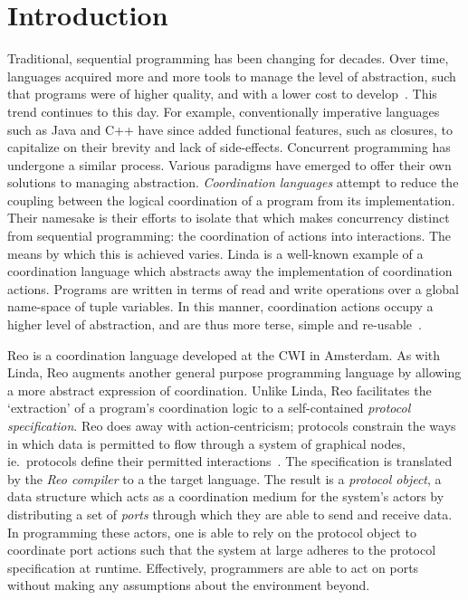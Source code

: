 \chapter{Introduction}	


Traditional, sequential programming has been changing for decades. Over time, languages acquired more and more tools to manage the level of abstraction, such that programs were of higher quality, and with a lower cost to develop~\cite{shaw1984abstraction}. This trend continues to this day. For example, conventionally imperative languages such as Java and C++ have since added functional features, such as closures, to capitalize on their brevity and lack of side-effects. Concurrent programming has undergone a similar process. Various paradigms have emerged to offer their own solutions to managing abstraction. \textit{Coordination languages} attempt to reduce the coupling between the logical coordination of a program from its implementation. Their namesake is their efforts to isolate that which makes concurrency distinct from sequential programming: the coordination of actions into interactions. The means by which this is achieved varies. Linda is a well-known example of a coordination language which abstracts away the implementation of coordination actions. Programs are written in terms of read and write operations over a global name-space of tuple variables. In this manner, coordination actions occupy a higher level of abstraction, and are thus more terse, simple and re-usable~\cite{gelernter1985generative}.


Reo is a coordination language developed at the CWI in Amsterdam. As with Linda, Reo augments another general purpose programming language by allowing a more abstract expression of coordination. Unlike Linda, Reo facilitates the `extraction' of a program's coordination logic to a self-contained \textit{protocol specification}. Reo does away with action-centricism; protocols constrain the ways in which data is permitted to flow through a system of graphical nodes, ie.\ protocols define their permitted interactions~\cite{arbab2005abstract}. The specification is translated by the \textit{Reo compiler} to a the target language. The result is a \textit{protocol object}, a data structure which acts as a coordination medium for the system's actors by distributing a set of \textit{ports} through which they are able to send and receive data. In programming these actors, one is able to rely on the protocol object to coordinate port actions such that the system at large adheres to the protocol specification at runtime. Effectively, programmers are able to act on ports without making any assumptions about the environment beyond.

